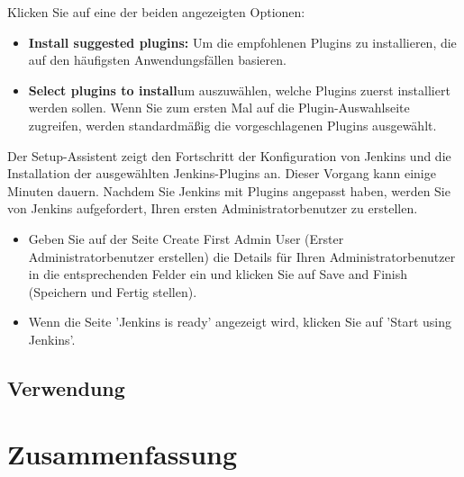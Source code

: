 \documentclass[a4paper,12pt,oneside]{book}
\begin{document}
\newline
Klicken Sie auf eine der beiden angezeigten Optionen:
\begin{itemize}
	\item \textbf{Install suggested plugins: } Um die empfohlenen Plugins zu installieren, die auf den häufigsten Anwendungsfällen basieren.
	\item \textbf{Select plugins to install}um auszuwählen, welche Plugins zuerst installiert werden sollen. Wenn Sie zum ersten Mal auf die Plugin-Auswahlseite zugreifen, werden standardmäßig die vorgeschlagenen Plugins ausgewählt.
\end{itemize}
Der Setup-Assistent zeigt den Fortschritt der Konfiguration von Jenkins und die Installation der ausgewählten Jenkins-Plugins an. Dieser Vorgang kann einige Minuten dauern.
\newline
Nachdem Sie Jenkins mit Plugins angepasst haben, werden Sie von Jenkins aufgefordert, Ihren ersten Administratorbenutzer zu erstellen.
\begin{itemize}
	\item Geben Sie auf der Seite Create First Admin User (Erster Administratorbenutzer erstellen) die Details für Ihren Administratorbenutzer in die entsprechenden Felder ein und klicken Sie auf Save and Finish (Speichern und Fertig stellen).
	\item Wenn die Seite 'Jenkins is ready' angezeigt wird, klicken Sie auf 'Start using Jenkins'.
\end{itemize}
\section{Verwendung}
\chapter{Zusammenfassung}
\begin{thebibliography}{9}
\end{thebibliography}
\end{document}
